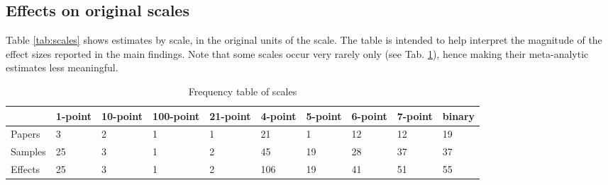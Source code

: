 \documentclass[
  man]{apa6}
\begin{document}
\subsection{Effects on original scales}\label{effects-on-original-scales}

Table \ref{tab:scales} shows estimates by scale, in the original units of the scale. The table is intended to help interpret the magnitude of the effect sizes reported in the main findings. Note that some scales occur very rarely only (see Tab. \ref{tab:n-scales}), hence making their meta-analytic estimates less meaningful.

\begin{table}[tbp]

\begin{center}
\begin{threeparttable}

\caption{\label{tab:n-scales}Frequency table of scales}

\begin{tabular}{llllllllll}
\toprule
 & \multicolumn{1}{c}{1-point} & \multicolumn{1}{c}{10-point} & \multicolumn{1}{c}{100-point} & \multicolumn{1}{c}{21-point} & \multicolumn{1}{c}{4-point} & \multicolumn{1}{c}{5-point} & \multicolumn{1}{c}{6-point} & \multicolumn{1}{c}{7-point} & \multicolumn{1}{c}{binary}\\
\midrule
Papers & 3 & 2 & 1 & 1 & 21 & 1 & 12 & 12 & 19\\
Samples & 25 & 3 & 1 & 2 & 45 & 19 & 28 & 37 & 37\\
Effects & 25 & 3 & 1 & 2 & 106 & 19 & 41 & 51 & 55\\
\bottomrule
\end{tabular}

\end{threeparttable}
\end{center}

\end{table}
\end{document}
